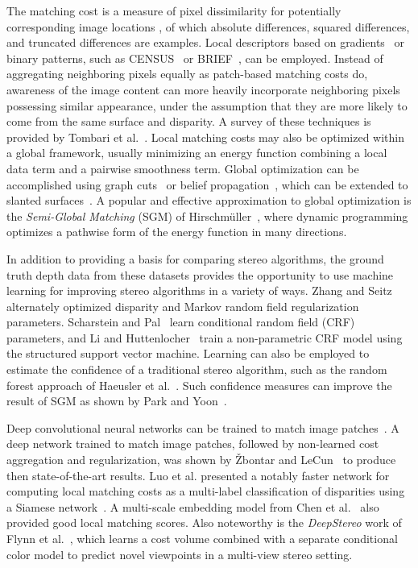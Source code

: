 \documentclass[10pt,twocolumn,letterpaper]{article}
\begin{document}
The matching cost is a measure of pixel dissimilarity for potentially corresponding image locations \cite{Hirschmuller2007}, of which absolute differences, squared differences, and truncated differences are examples.  
Local descriptors based on gradients~\cite{Geiger2010} or binary patterns, such as CENSUS~\cite{Zabih1994} or BRIEF~\cite{Calonder2010,Heise2015}, can be employed.  
Instead of aggregating neighboring pixels equally as patch-based matching costs do, awareness of the image content can more heavily incorporate neighboring pixels possessing similar appearance, under the assumption that they are more likely to come from the same surface and disparity.  A survey of these techniques is provided by Tombari et al.~\cite{Tombari2008}.  
Local matching costs may also be optimized within a global framework, usually minimizing an energy function combining a local data term and a pairwise smoothness term.  Global optimization can be accomplished using graph cuts~\cite{Kolmogorov2001} or belief propagation~\cite{Klaus2006}, which can be extended to slanted surfaces~\cite{Bleyer2011}. A popular and effective approximation to global optimization is the \emph{Semi-Global Matching} (SGM) of Hirschm{\"u}ller~\cite{Hirschmuller2008}, where dynamic programming optimizes a pathwise form of the energy function in many directions.

In addition to providing a basis for comparing stereo algorithms, the ground truth depth data from these datasets provides the opportunity to use machine learning for improving stereo algorithms in a variety of ways.  Zhang and Seitz~\cite{Zhang2007} alternately optimized disparity and Markov random field regularization parameters.  Scharstein and Pal~\cite{Scharstein2007} learn conditional random field (CRF) parameters, and Li and Huttenlocher~\cite{Li2008} train a non-parametric CRF model using the structured support vector machine.  Learning can also be employed to estimate the confidence of a traditional stereo algorithm, such as the random forest approach of Haeusler et al.~\cite{Haeusler2013a}.  Such confidence measures can improve the result of SGM as shown by Park and Yoon~\cite{Park2015}.

Deep convolutional neural networks can be trained to match image patches~\cite{Zagoruyko2015}.  A deep network trained to match  image patches, followed by non-learned cost aggregation and regularization, was shown by {\v Z}bontar and LeCun~\cite{Zbontar2015a,Zbontar2015} to produce then state-of-the-art results.  Luo et al. presented a notably faster network for computing local matching costs as a multi-label classification of disparities using a Siamese network~\cite{Luo2016}.  A multi-scale embedding model from Chen et al.~\cite{Chen2016} also provided good local matching scores.  Also noteworthy is the \emph{DeepStereo} work of Flynn et al.~\cite{Flynn2016}, which learns a cost volume combined with a separate conditional color model to predict novel viewpoints in a multi-view stereo setting.
\end{document}
